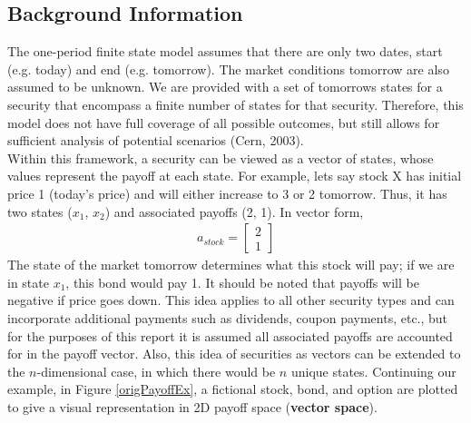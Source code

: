 \documentclass[a4paper,11pt]{report}
\begin{document}
\begin{multicols}{2}
\section{Background Information}
The one-period finite state model assumes that there are only two dates, start (e.g. today) and end (e.g. tomorrow). The market conditions tomorrow are also assumed to be unknown. We are provided with a set of tomorrows states for a security that encompass a finite number of states for that security. Therefore, this model does not have full coverage of all possible outcomes, but still allows for sufficient analysis of potential scenarios (Cern, 2003).
\\
\indent
Within this framework, a security can be viewed as a vector of states, whose values represent the payoff at each state. For example, lets say stock X has initial price 1 (today's price) and will either increase to 3 or 2 tomorrow. Thus, it has two states ($x_1$, $x_2$) and associated payoffs (2, 1). In vector form,
\begin{align*}
	a_{stock} = \left[\begin{array}{c}2\\ 1\end{array}\right]
\end{align*}
\indent
The state of the market tomorrow determines what this stock will pay; if we are in state $x_1$, this bond would pay 1. 
It should be noted that payoffs will be negative if price goes down. This idea applies to all other security types and can incorporate additional payments such as dividends, coupon payments, etc., but for the purposes of this report it is assumed all associated payoffs are accounted for in the payoff vector. 
Also, this idea of securities as vectors can be extended to the $n$-dimensional case, in which there would be $n$ unique states. 
Continuing our example, in Figure \ref{origPayoffEx}, a fictional stock, bond, and option are plotted to give a visual representation in 2D payoff space (\textbf{vector space}).



\end{multicols}
\end{document}
